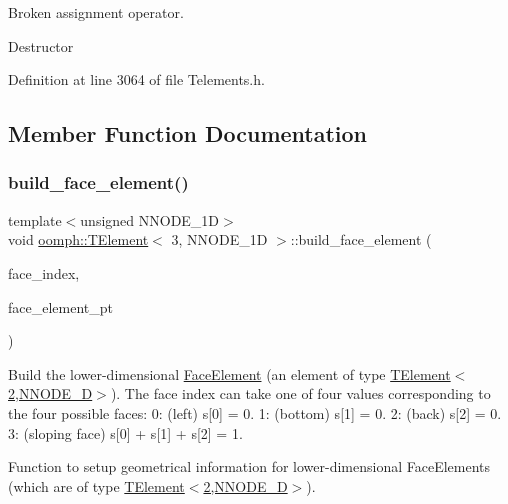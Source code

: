 Broken assignment operator. 

Destructor 

Definition at line 3064 of file Telements.\+h.



\subsection{Member Function Documentation}
\mbox{\label{classoomph_1_1TElement_3_013_00_01NNODE__1D_01_4_ad28be1d4ceed10d143dccbeb0021d507}} 
\subsubsection{\texorpdfstring{build\+\_\+face\+\_\+element()}{build\_face\_element()}}
{\footnotesize\ttfamily template$<$unsigned N\+N\+O\+D\+E\+\_\+1D$>$ \\
void \hyperlink{classoomph_1_1TElement}{oomph\+::\+T\+Element}$<$ 3, N\+N\+O\+D\+E\+\_\+1D $>$\+::build\+\_\+face\+\_\+element (\begin{DoxyParamCaption}\item[{const int \&}]{face\+\_\+index,  }\item[{\hyperlink{classoomph_1_1FaceElement}{Face\+Element} $\ast$}]{face\+\_\+element\+\_\+pt }\end{DoxyParamCaption})\hspace{0.3cm}{\ttfamily [virtual]}}



Build the lower-\/dimensional \hyperlink{classoomph_1_1FaceElement}{Face\+Element} (an element of type \hyperlink{classoomph_1_1TElement_3_012_00_01NNODE__1D_01_4}{T\+Element$<$2,\+N\+N\+O\+D\+E\+\_\+D$>$}). The face index can take one of four values corresponding to the four possible faces\+: 0\+: (left) s\mbox{[}0\mbox{]} = 0. 1\+: (bottom) s\mbox{[}1\mbox{]} = 0. 2\+: (back) s\mbox{[}2\mbox{]} = 0. 3\+: (sloping face) s\mbox{[}0\mbox{]} + s\mbox{[}1\mbox{]} + s\mbox{[}2\mbox{]} = 1. 

Function to setup geometrical information for lower-\/dimensional Face\+Elements (which are of type \hyperlink{classoomph_1_1TElement_3_012_00_01NNODE__1D_01_4}{T\+Element$<$2,\+N\+N\+O\+D\+E\+\_\+D$>$}). 

